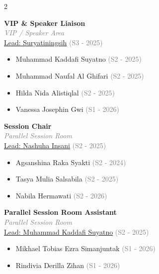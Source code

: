 \documentclass[10pt,a4paper]{article}
\begin{document}
\begin{multicols}{2}
\begin{minipage}{\linewidth}
\textbf{\color{conf}VIP \& Speaker Liaison}\\
\textcolor{gray}{\emph{VIP / Speaker Area}}\\
\small \underline{Lead: Suryatiningsih} \textcolor{gray}{(S3 - 2025)}\\
\begin{itemize}\setlength{\itemsep}{0pt}
  \item Muhammad Kaddafi Suyatno \textcolor{gray}{(S2 - 2025)}
  \item Muhammad Naufal Al Ghifari \textcolor{gray}{(S2 - 2025)}
  \item Hilda Nida Alistiqlal \textcolor{gray}{(S2 - 2025)}
  \item Vanessa Josephin Gwi \textcolor{gray}{(S1 - 2026)}
\end{itemize}
\end{minipage}
\vspace{0.8em}

\begin{minipage}{\linewidth}
\textbf{\color{conf}Session Chair}\\
\textcolor{gray}{\emph{Parallel Session Room}}\\
\small \underline{Lead: Nashuha Insani} \textcolor{gray}{(S2 - 2025)}\\
\begin{itemize}\setlength{\itemsep}{0pt}
  \item Agsanshina Raka Syakti \textcolor{gray}{(S2 - 2024)}
  \item Tasya Mulia Salsabila \textcolor{gray}{(S2 - 2025)}
  \item Nabila Hermawati \textcolor{gray}{(S2 - 2026)}
\end{itemize}
\end{minipage}
\vspace{0.8em}

\begin{minipage}{\linewidth}
\textbf{\color{conf}Parallel Session Room Assistant}\\
\textcolor{gray}{\emph{Parallel Session Room}}\\
\small \underline{Lead: Muhammad Kaddafi Suyatno} \textcolor{gray}{(S2 - 2025)}\\
\begin{itemize}\setlength{\itemsep}{0pt}
  \item Mikhael Tobias Ezra Simanjuntak \textcolor{gray}{(S1 - 2026)}
  \item Rindivia Derilla Zihan \textcolor{gray}{(S1 - 2026)}
\end{itemize}
\end{minipage}
\vspace{0.8em}


\end{multicols}
\end{document}

